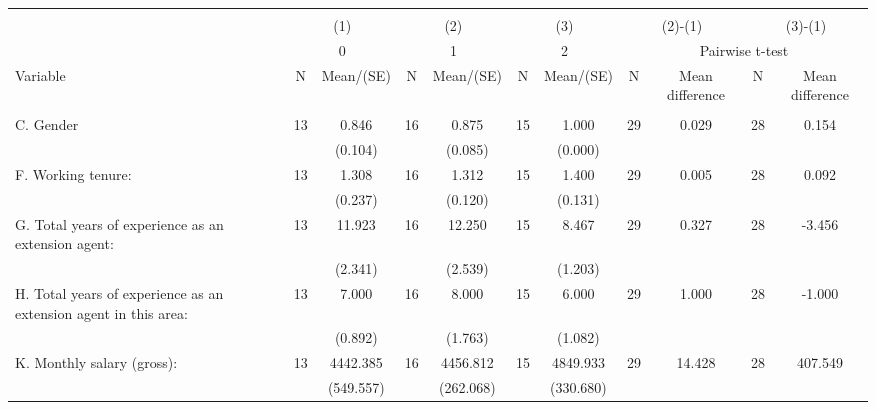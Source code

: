 
\begin{tabular}{@{\extracolsep{5pt}}lcccccccccc}
\\[-1.8ex]\hline \hline \\[-1.8ex]
 & \multicolumn{2}{c}{(1)}  & \multicolumn{2}{c}{(2)}  & \multicolumn{2}{c}{(3)}  & \multicolumn{2}{c}{(2)-(1)} & \multicolumn{2}{c}{(3)-(1)} \\
 & \multicolumn{2}{c}{0}  & \multicolumn{2}{c}{1}  & \multicolumn{2}{c}{2}  & \multicolumn{4}{c}{Pairwise t-test}  \\
Variable & N & Mean/(SE) & N & Mean/(SE) & N & Mean/(SE) & N & Mean difference & N & Mean difference \\ \hline \\[-1.8ex] 
C. Gender   & 13    & 0.846    & 16    & 0.875    & 15    & 1.000    & 29    & 0.029    & 28    & 0.154   \\
 &   & (0.104)  &   & (0.085)  &   & (0.000)  &   &  &   &  \\ [1ex]
F. Working tenure:   & 13    & 1.308    & 16    & 1.312    & 15    & 1.400    & 29    & 0.005    & 28    & 0.092   \\
 &   & (0.237)  &   & (0.120)  &   & (0.131)  &   &  &   &  \\ [1ex]
G. Total years of experience as an extension agent:   & 13    & 11.923    & 16    & 12.250    & 15    & 8.467    & 29    & 0.327    & 28    & -3.456   \\
 &   & (2.341)  &   & (2.539)  &   & (1.203)  &   &  &   &  \\ [1ex]
H. Total years of experience as an extension agent in this area:   & 13    & 7.000    & 16    & 8.000    & 15    & 6.000    & 29    & 1.000    & 28    & -1.000   \\
 &   & (0.892)  &   & (1.763)  &   & (1.082)  &   &  &   &  \\ [1ex]
K. Monthly salary (gross):   & 13    & 4442.385    & 16    & 4456.812    & 15    & 4849.933    & 29    & 14.428    & 28    & 407.549   \\
 &   & (549.557)  &   & (262.068)  &   & (330.680)  &   &  &   &  \\ [1ex]

\end{tabular}
